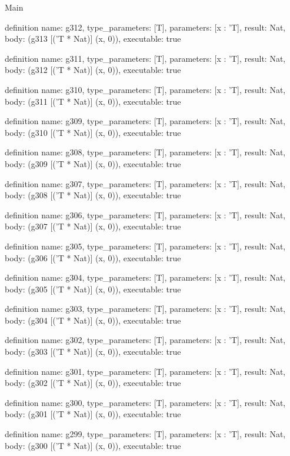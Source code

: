 \begin{lexlean}{Main}
\begin{semanticmodule}
definition{
  name: g312,
  type_parameters: [T],
  parameters: [x : 'T],
  result: Nat,
  body: (g313 [('T * Nat)] (x, 0)),
  executable: true
}

definition{
  name: g311,
  type_parameters: [T],
  parameters: [x : 'T],
  result: Nat,
  body: (g312 [('T * Nat)] (x, 0)),
  executable: true
}

definition{
  name: g310,
  type_parameters: [T],
  parameters: [x : 'T],
  result: Nat,
  body: (g311 [('T * Nat)] (x, 0)),
  executable: true
}

definition{
  name: g309,
  type_parameters: [T],
  parameters: [x : 'T],
  result: Nat,
  body: (g310 [('T * Nat)] (x, 0)),
  executable: true
}

definition{
  name: g308,
  type_parameters: [T],
  parameters: [x : 'T],
  result: Nat,
  body: (g309 [('T * Nat)] (x, 0)),
  executable: true
}

definition{
  name: g307,
  type_parameters: [T],
  parameters: [x : 'T],
  result: Nat,
  body: (g308 [('T * Nat)] (x, 0)),
  executable: true
}

definition{
  name: g306,
  type_parameters: [T],
  parameters: [x : 'T],
  result: Nat,
  body: (g307 [('T * Nat)] (x, 0)),
  executable: true
}

definition{
  name: g305,
  type_parameters: [T],
  parameters: [x : 'T],
  result: Nat,
  body: (g306 [('T * Nat)] (x, 0)),
  executable: true
}

definition{
  name: g304,
  type_parameters: [T],
  parameters: [x : 'T],
  result: Nat,
  body: (g305 [('T * Nat)] (x, 0)),
  executable: true
}

definition{
  name: g303,
  type_parameters: [T],
  parameters: [x : 'T],
  result: Nat,
  body: (g304 [('T * Nat)] (x, 0)),
  executable: true
}

definition{
  name: g302,
  type_parameters: [T],
  parameters: [x : 'T],
  result: Nat,
  body: (g303 [('T * Nat)] (x, 0)),
  executable: true
}

definition{
  name: g301,
  type_parameters: [T],
  parameters: [x : 'T],
  result: Nat,
  body: (g302 [('T * Nat)] (x, 0)),
  executable: true
}

definition{
  name: g300,
  type_parameters: [T],
  parameters: [x : 'T],
  result: Nat,
  body: (g301 [('T * Nat)] (x, 0)),
  executable: true
}

definition{
  name: g299,
  type_parameters: [T],
  parameters: [x : 'T],
  result: Nat,
  body: (g300 [('T * Nat)] (x, 0)),
  executable: true
}


\end{semanticmodule}
\end{lexlean}
